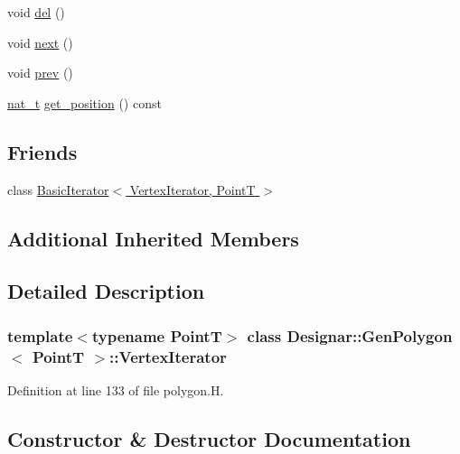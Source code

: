 \begin{DoxyCompactItemize}
\item 
void \hyperlink{class_designar_1_1_gen_polygon_1_1_vertex_iterator_a6e906d0fb0472f35e11bcc7ec7faa9e7}{del} ()
\item 
void \hyperlink{class_designar_1_1_gen_polygon_1_1_vertex_iterator_a85d990ecb087c96de85b6743d0e2ab0b}{next} ()
\item 
void \hyperlink{class_designar_1_1_gen_polygon_1_1_vertex_iterator_ade90ad67041eff5d563f2afcad38acd1}{prev} ()
\item 
\hyperlink{namespace_designar_aa72662848b9f4815e7bf31a7cf3e33d1}{nat\+\_\+t} \hyperlink{class_designar_1_1_gen_polygon_1_1_vertex_iterator_a44f1777dd9aa54546cd497500a5232fb}{get\+\_\+position} () const
\end{DoxyCompactItemize}
\subsection*{Friends}
\begin{DoxyCompactItemize}
\item 
class \hyperlink{class_designar_1_1_gen_polygon_1_1_vertex_iterator_a580630487e8bbe9b1152cc636325bee6}{Basic\+Iterator$<$ Vertex\+Iterator, Point\+T $>$}
\end{DoxyCompactItemize}
\subsection*{Additional Inherited Members}


\subsection{Detailed Description}
\subsubsection*{template$<$typename PointT$>$\newline
class Designar\+::\+Gen\+Polygon$<$ Point\+T $>$\+::\+Vertex\+Iterator}



Definition at line 133 of file polygon.\+H.



\subsection{Constructor \& Destructor Documentation}
\mbox{\label{class_designar_1_1_gen_polygon_1_1_vertex_iterator_af12ab8f901a5d0fe153a8a5ce8fd9639}} 
